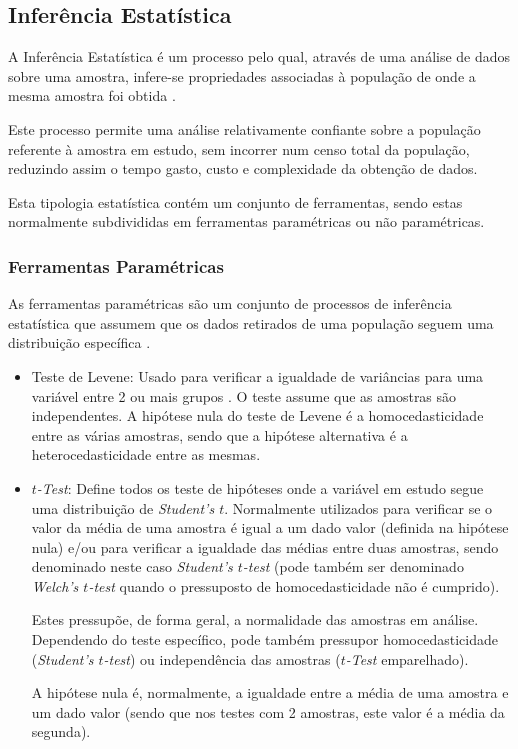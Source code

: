 \documentclass[conference]{IEEEtran}
\begin{document}
\subsection{Inferência Estatística}

A Inferência Estatística é um processo pelo qual, através de uma análise de dados sobre uma amostra, infere-se propriedades associadas à população de onde a mesma amostra foi obtida \cite{Upton_Cook_2008}.

Este processo permite uma análise relativamente confiante sobre a população referente à amostra em estudo, sem incorrer num censo total da população, reduzindo assim o tempo gasto, custo e complexidade da obtenção de dados.

Esta tipologia estatística contém um conjunto de ferramentas, sendo estas normalmente subdivididas em ferramentas paramétricas ou não paramétricas. 

\subsubsection{Ferramentas Paramétricas}

As ferramentas paramétricas são um conjunto de processos de inferência estatística que assumem que os dados retirados de uma população seguem uma distribuição específica \cite{Cox_2006}.

\begin{itemize}
    \item Teste de Levene: Usado para verificar a igualdade de variâncias para uma variável entre 2 ou mais grupos \cite{10.1137/1003016}.  O teste assume que as amostras são independentes.
A hipótese nula do teste de Levene é a homocedasticidade entre as várias amostras, sendo que a hipótese alternativa é a heterocedasticidade entre as mesmas.

    \item \textit{$t$-Test}: Define todos os teste de hipóteses onde a variável em estudo segue uma distribuição de \textit{Student's $t$}. Normalmente utilizados para verificar se o valor da média de uma amostra é igual a um dado valor (definida na hipótese nula) e/ou para verificar a igualdade das médias entre duas amostras, sendo denominado neste caso \textit{Student's $t$-test} (pode também ser denominado \textit{Welch's $t$-test} quando o pressuposto de homocedasticidade não é cumprido).

Estes pressupõe, de forma geral, a normalidade das amostras em análise. Dependendo do teste específico, pode também pressupor homocedasticidade (\textit{Student's $t$-test}) ou independência das amostras (\textit{$t$-Test} emparelhado).

A hipótese nula é, normalmente, a igualdade entre a média de uma amostra e um dado valor (sendo que nos testes com 2 amostras, este valor é a média da segunda).

\end{itemize}
\end{document}
